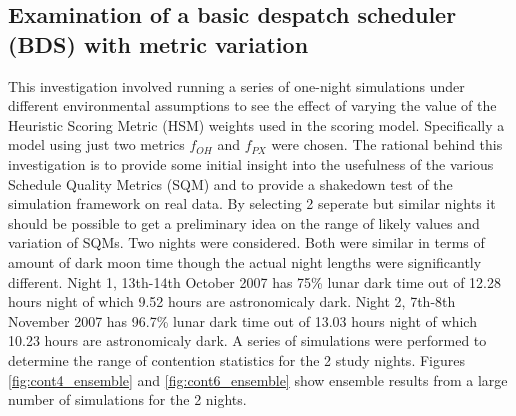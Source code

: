 \documentclass[12pt,a4paper]{article}
\begin{document}
{%
\subsection{Examination of a basic despatch scheduler (BDS) with metric variation}
\label{subsect:bds}
This investigation involved running a series of one-night simulations under different environmental assumptions to see the effect of varying the value of the Heuristic Scoring Metric (HSM) weights used in the scoring model. Specifically a model using just two metrics $f_{OH}$ and $f_{PX}$ were chosen. 
The rational behind this investigation is to provide some initial insight into the usefulness of the various Schedule Quality Metrics (SQM) and to provide a shakedown test of the simulation framework on real data. By selecting 2 seperate but similar nights it should be possible to get a preliminary idea on the range of likely values and variation of SQMs.
Two nights were considered. Both were similar in terms of amount of dark moon time though the actual night lengths were significantly different. Night 1, 13th-14th October 2007 has 75\% lunar dark time out of 12.28 hours night of which 9.52 hours are astronomicaly dark. Night 2, 7th-8th November 2007 has 96.7\% lunar dark time out of 13.03 hours night of which 10.23 hours are astronomicaly dark.
A series of simulations were performed to determine the range of contention statistics for the 2 study nights. Figures \ref{fig:cont4_ensemble} and \ref{fig:cont6_ensemble} show ensemble results from a large number of simulations for the 2 nights.

}
\end{document}

